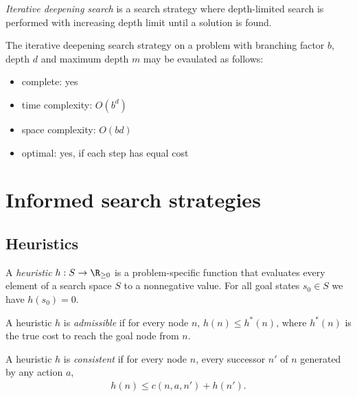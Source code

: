 \documentclass{article}
\begin{document}
\begin{definition}
    \emph{Iterative deepening search} is a search strategy where
    depth-limited search is performed with increasing depth limit until
    a solution is found.
\end{definition}

\begin{theorem}
    The iterative deepening search strategy on a problem with branching factor
    $b$, depth $d$ and maximum depth $m$ may be evaulated as follows:
    \begin{itemize}
        \item complete: yes
        \item time complexity: $O(b^d)$
        \item space complexity: $O(bd)$
        \item optimal: yes, if each step has equal cost
    \end{itemize}
\end{theorem}


\section{Informed search strategies}

\subsection{Heuristics}

\begin{definition}
    A \emph{heuristic} $h:S\to \R_{\geq 0}$ is a problem-specific function
    that evaluates every element of a search space $S$ to a nonnegative value.
    For all goal states $s_0\in S$ we have $h(s_0)=0$.
\end{definition}

\begin{definition}
    A heuristic $h$ is \emph{admissible} if for every node $n$, $h(n)\leq h^*(n)$,
    where $h^*(n)$ is the true cost to reach the goal node from $n$.
\end{definition}

\begin{definition}
    A heuristic $h$ is \emph{consistent} if for every node $n$, every
    successor $n'$ of $n$ generated by any action $a$,
    \begin{align*}
        h(n) \leq c(n, a, n') + h(n').
    \end{align*}
\end{definition}
\end{document}
